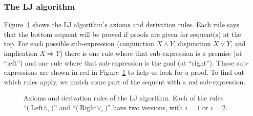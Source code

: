 \subsubsection*{The LJ algorithm}

Figure~\ref{fig:Rules-of-the-LJ-algorithm} shows the LJ algorithm\textsf{'}s
axioms and derivation rules. Each rule says that the bottom sequent
will be proved if proofs are given for sequent(s) at the top. For
each possible sub-expression (conjunction $X\wedge Y$, disjunction
$X\vee Y$, and implication $X\Rightarrow Y$) there is one rule where
that sub-expression is a premise (at \textsf{``}left\textsf{''}) and one rule where
that sub-expression is the goal (at \textsf{``}right\textsf{''}). Those sub-expressions
are shown in red in Figure~\ref{fig:Rules-of-the-LJ-algorithm} to
help us look for a proof. To find out which rules apply, we match
some part of the sequent with a red sub-expression.

\begin{figure}
\begin{centering}
\par\end{centering}
\caption{Axioms and derivation rules of the LJ algorithm. Each of the rules
\textquotedblleft ($\text{Left}\wedge_{i}$)\textquotedblright{} and
\textquotedblleft ($\text{Right}\vee_{i}$)\textquotedblright{} have
two versions, with $i=1$ or $i=2$. \label{fig:Rules-of-the-LJ-algorithm}}
\end{figure}

